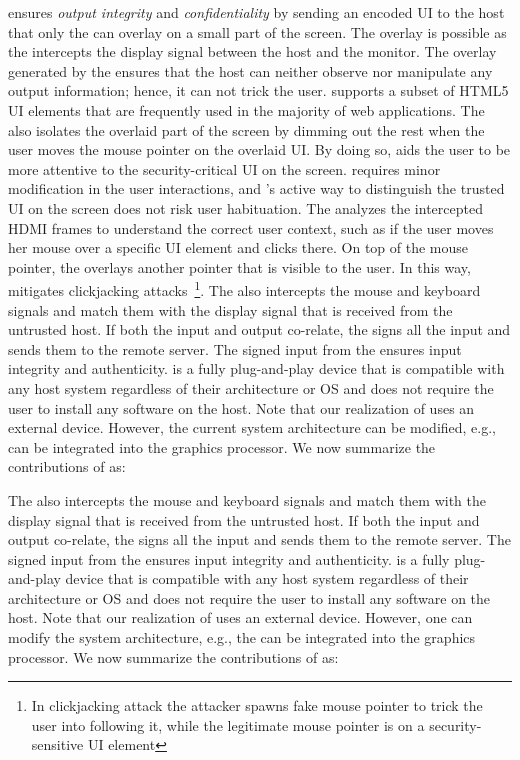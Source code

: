 \name ensures \emph{output integrity} and \emph{confidentiality} by sending an encoded UI to the host that only the \device can overlay on a small part of the screen. The overlay is possible as the \device intercepts the display signal between the host and the monitor. The overlay generated by the \device ensures that the host can neither observe nor manipulate any output information; hence, it can not trick the user. \device supports a subset of HTML5 UI elements that are frequently used in the
majority of web applications. The \device also isolates the overlaid part of the screen by dimming out the rest when the user moves the mouse pointer on the overlaid UI. By doing so, \name aids the user to be more attentive to the security-critical UI on the screen. \name requires minor modification in the user interactions, and \name's active way to distinguish the trusted UI on the screen does not risk user habituation. The \device analyzes the intercepted HDMI frames to understand the correct user context, such as if the user moves her mouse over a specific UI element and clicks there. On top of the mouse pointer, the \device overlays another pointer that is visible to the user. In this way, \name mitigates clickjacking attacks~\footnote{In clickjacking attack the attacker spawns fake mouse pointer to trick the user into following it, while the legitimate mouse pointer is on a security-sensitive UI element}. The \device also intercepts the mouse and keyboard signals and match them with the display signal that is received from the untrusted host. If both the input and output co-relate, the \device signs all the input and sends them to the remote server. The signed input from the \device ensures input integrity and authenticity. \device is a fully plug-and-play device that is compatible with any host system regardless of their architecture or OS and does not require the user to install any software on the host. Note that our realization of \name uses an external device. However, the current system architecture can be modified, e.g., \device can be integrated into the graphics processor. We now summarize the contributions of \name as:

The \device also intercepts the mouse and keyboard signals and match them with the display signal that is received from the untrusted host. If both the input and output co-relate, the \device signs all the input and sends them to the remote server. The signed input from the \device ensures input integrity and authenticity. \device is a fully plug-and-play device that is compatible with any host system regardless of their architecture or OS and does not require the user to install any software on the host. Note that our realization of \name uses an external device. However, one can modify the system architecture, e.g., the \device can be integrated into the graphics processor. We now summarize the contributions of \name as:

